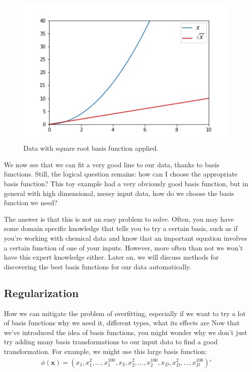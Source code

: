 \begin{figure}
    \centering
    \includegraphics[width=0.5\paperwidth]{../LinearRegression/fig/lin_reg_w_basis_fn_GEN.jpg}
    \caption{Data with square root basis function applied.}
    \label{fig:lin-reg-w-basis-fn-fitted}
\end{figure}

We now see that we can fit a very good line to our data, thanks to basis functions. Still, the logical question remains: how can I choose the appropriate basis function? This toy example had a very obviously good basis function, but in general with high dimensional, messy input data, how do we choose the basis function we need?

The answer is that this is not an easy problem to solve. Often, you may have some domain specific knowledge that tells you to try a certain basis, such as if you're working with chemical data and know that an important equation involves a certain function of one of your inputs. However, more often than not we won't have this expert knowledge either. Later on, we will discuss methods for discovering the best basis functions for our data automatically.

\subsection{Regularization}
How we can mitigate the problem of overfitting, especially if we want to try a lot of basis functions
why we need it, different types, what its effects are
Now that we've introduced the idea of basis functions, you might wonder why we don't just try adding many basis transformations to our input data to find a good transformation. For example, we might use this large basis function:
\begin{align*}
    \phi(\textbf{x}) = (x_{1}, x_{1}^{2}, ..., x_{1}^{100}, x_{2}, x_{2}^{2}, ..., x_{2}^{100}, x_{D}, x_{D}^{2}, ..., x_{D}^{100})'
\end{align*}

